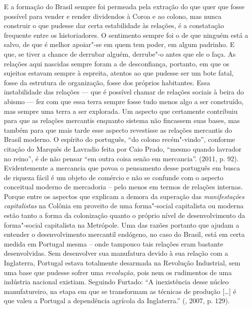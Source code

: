 E a formação do Brasil sempre foi permeada pela extração do que quer que
fosse possível para vender e render dividendos à Coroa e ao colono, mas
nunca construir o que pudesse dar certa estabilidade às relações, é a
constatação frequente entre os historiadores. O sentimento sempre foi o
de que ninguém está a salvo, de que é melhor apoiar"-se em quem tem
poder, em algum padrinho. E que, se tiver a chance de derrubar alguém,
derrube"-o antes que ele o faça. As relações aqui nascidas sempre foram a
de desconfiança, portanto, em que os sujeitos estavam sempre à espreita,
atentos ao que pudesse ser um bote fatal, fosse da estrutura de
organização, fosse dos próprios habitantes. Essa instabilidade das
relações --- que é possível chamar de relações sociais à beira do
abismo --- fez com que essa terra sempre fosse tudo menos algo a ser
construído, mas sempre uma terra a ser explorada. Um aspecto que
certamente contribuiu para que as relações mercantis enquanto sistema
não fincassem suas bases, mas também para que mais tarde esse aspecto revestisse
as relações mercantis do Brasil moderno. O espírito do português, ``do colono
recém"-vindo'', conforme citação do Marquês de Lavradio feita por Caio
Prado, ``mesmo quando lavrador no reino'', é de não pensar ``em outra
coisa senão em mercancia''. (2011, p. 92). Evidentemente a mercancia que
povoa o pensamento desse português em busca de riqueza fácil é um objeto
de comércio e não se confunde com o aspecto conceitual moderno de
mercadoria -- pelo menos em termos de relações internas. Porque entre os
aspectos que explicam a demora da superação das \emph{manifestações
capitalistas} na Colônia em proveito de uma forma"-social capitalista ou
moderna estão tanto a forma da colonização quanto o próprio nível de
desenvolvimento da forma"-social capitalista na Metrópole. Uma das razões
portanto que ajudam a entender o desenvolvimento mercantil endógeno, no
caso do Brasil, está em certa medida em Portugal mesma -- onde tampouco
tais relações eram bastante desenvolvidas. Sem desenvolver sua
manufatura devido à sua relação com a Inglaterra, Portugal estava
totalmente desarmada na Revolução Industrial, sem uma base que pudesse
sofrer uma \emph{revolução}, pois nem os rudimentos de uma indústria
nacional existiam. Seguindo Furtado: ``A inexistência desse núcleo
manufatureiro, na etapa em que se transformam as técnicas de produção
[\ldots{}] é que valeu a Portugal a dependência agrícola da Inglaterra.''
(, 2007, p. 129).

